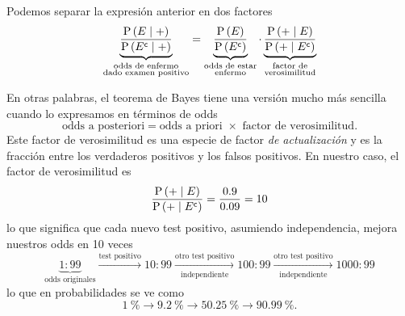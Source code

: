 Podemos separar la expresión anterior en dos factores \[\underbrace{\frac{\operatorname{P}\left(E\;\middle|\;+\right)}{\operatorname{P}\left({E}^{\mathsf{c}}\;\middle|\;+\right)}}_{\substack{\text{odds de enfermo} \\ \text{dado examen positivo}}} = \underbrace{\frac{\operatorname{P}\left( E \right)}{\operatorname{P}\left( {E}^{\mathsf{c}} \right)}}_{\substack{\text{odds de estar}\\ \text{enfermo}}}\cdot\underbrace{\frac{\operatorname{P}\left(+\;\middle|\;E\right)}{\operatorname{P}\left(+\;\middle|\;{E}^{\mathsf{c}}\right)}}_{\substack{\text{factor de}\\ \text{verosimilitud}}}\]

En otras palabras, el teorema de Bayes tiene una versión mucho más sencilla cuando lo expresamos en términos de odds \[\text{odds a posteriori} = \text{odds a priori }\times\text{ factor de verosimilitud.}\] Este factor de verosimilitud es una especie de factor \emph{de actualización} y es la fracción entre los verdaderos positivos y los falsos positivos. En nuestro caso, el factor de verosimilitud es \[\frac{\operatorname{P}\left(+\;\middle|\;E\right)}{\operatorname{P}\left(+\;\middle|\;{E}^{\mathsf{c}}\right)} = \frac{\num{0,9}}{\num{0,09}}=10\] lo que significa que cada nuevo test positivo, asumiendo independencia, mejora nuestros odds en 10 veces \[\underbrace{1:99}_{\text{odds originales}} \xrightarrow{\text{test positivo}}10:99\xrightarrow[\text{independiente}]{\text{otro test positivo}}100:99 \xrightarrow[\text{independiente}]{\text{otro test positivo}}1000:99\] lo que en probabilidades se ve como \[\qty{1}{\percent} \rightarrow \qty{9,2}{\percent} \rightarrow \qty{50,25}{\percent} \rightarrow \qty{90,99}{\percent}.\]